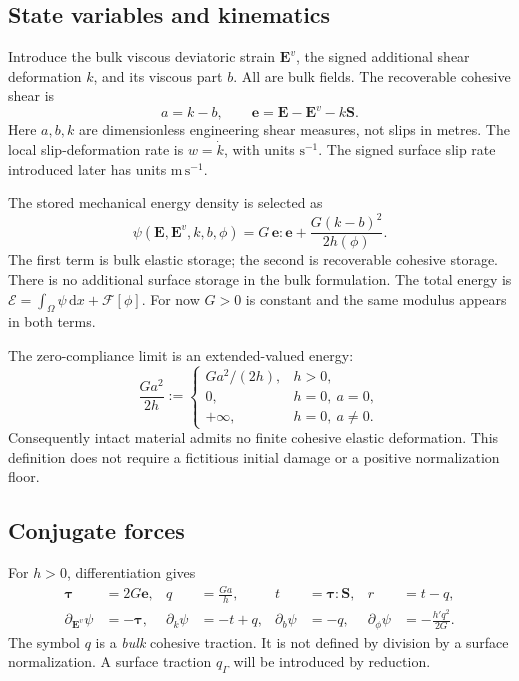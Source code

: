 \documentclass[11pt,a4paper]{article}
\numberwithin{equation}{section}
\newcommand{\dd}{\,\mathrm d}
\newcommand{\E}{\bm E}
\newcommand{\Ev}{\bm E^{v}}
\newcommand{\Sg}{\bm S}
\newcommand{\ta}{\bm\tau}
\newcommand{\calE}{\mathcal E}
\newcommand{\F}{\mathcal F}
\begin{document}
\subsection{State variables and kinematics}

Introduce the bulk viscous deviatoric strain $\Ev$, the signed additional
shear deformation $k$, and its viscous part $b$. All are bulk fields.
The recoverable cohesive shear is
\begin{equation}
 a=k-b,\qquad
 \bm e=\E-\Ev-k\Sg.
 \label{eq:kinematics}
\end{equation}
Here $a,b,k$ are dimensionless engineering shear measures, not slips in metres.
The local slip-deformation rate is $w=\dot k$, with units $\mathrm{s}^{-1}$.
The signed surface slip rate introduced later has units $\mathrm{m\,s}^{-1}$.

The stored mechanical energy density is selected as
\begin{equation}
 \boxed{\psi(\E,\Ev,k,b,\phi)
       =G\,\bm e:\bm e+\frac{G(k-b)^2}{2h(\phi)}.}
 \label{eq:bulkenergy}
\end{equation}
The first term is bulk elastic storage; the second is recoverable cohesive
storage. There is no additional surface storage in the bulk formulation.
The total energy is
$\calE=\int_\Omega\psi\dd x+\F[\phi]$.
For now $G>0$ is constant and the same modulus appears in both terms.

The zero-compliance limit is an extended-valued energy:
\begin{equation}
 \frac{Ga^2}{2h}:=
 \begin{cases}
  Ga^2/(2h),&h>0,\\
  0,&h=0,\ a=0,\\
  +\infty,&h=0,\ a\ne0.
 \end{cases}
 \label{eq:closedperspective}
\end{equation}
Consequently intact material admits no finite cohesive elastic deformation.
This definition does not require a fictitious initial damage or a positive
normalization floor.

\subsection{Conjugate forces}

For $h>0$, differentiation gives
\begin{align}
 \ta&=2G\bm e,&
 q&=\frac{Ga}{h},&
 t&=\ta:\Sg,&
 r&=t-q, \label{eq:forces}\\
 \partial_{\Ev}\psi&=-\ta,&
 \partial_k\psi&=-t+q,&
 \partial_b\psi&=-q,&
 \partial_\phi\psi&=-\frac{h'q^2}{2G}.
 \label{eq:partials}
\end{align}
The symbol $q$ is a \emph{bulk} cohesive traction. It is not defined by
division by a surface normalization. A surface traction $q_\Gamma$ will be
introduced by reduction.
\end{document}
